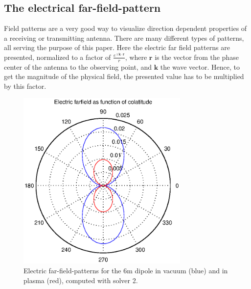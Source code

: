 \documentclass[draft,ras]{agutex}
\begin{document}
\begin{article}
\subsection{The electrical far-field-pattern}
Field patterns are a very good way to visualize direction dependent properties of a receiving or transmitting antenna. There are many different types of patterns, all serving the purpose of this paper. Here the electric far field patterns are presented, normalized to a factor of $\frac{e^{\imath \mathbf{k}\cdot \mathbf{r}}}{r}$, where $\mathbf{r}$ is the vector from the phase center of the antenna to the observing point, and $\mathbf{k}$ the wave vector. Hence, to get the magnitude of the physical field, the presented value has to be multiplied by this factor.\\

\begin{figure}
  \noindent\includegraphics[width=20pc]{ff_10mhz.eps}
\caption{Electric far-field-patterns for the 6m dipole in vacuum (blue) and in plasma (red), computed with solver 2.}
\label{fig:patterns_vacuum}
\end{figure}


\end{article}
\end{document}
